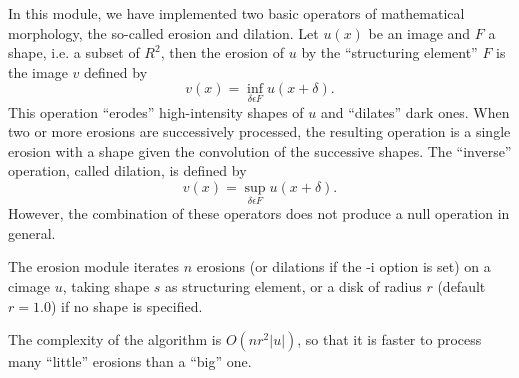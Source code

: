 In this module, we have implemented two basic operators of mathematical 
morphology, the so-called erosion and dilation. Let $u(x)$ be an image 
and $F$ a shape, i.e. a subset of $R^2$, then the erosion of $u$ by the 
``structuring element'' $F$ is the image $v$ defined by
$$v(x) = \inf_{\delta \epsilon F} u(x+\delta).$$
This operation ``erodes'' high-intensity shapes of $u$ and ``dilates'' dark 
ones. 
When two or more erosions are successively processed, the resulting operation 
is a single erosion with a shape given the convolution of the successive 
shapes.
The ``inverse'' operation, called dilation, is defined by
$$v(x) = \sup_{\delta \epsilon F} u(x+\delta).$$
However, the combination of these operators does not produce a null 
operation in general.

The {\sf erosion} module iterates $n$ erosions (or dilations if the -i option 
is set) 
on a cimage $u$, taking shape $s$ as structuring element, or a disk of radius
$r$ (default $r=1.0$) if no shape is specified.

The complexity of the algorithm is $O(n r^2 |u|)$, so that it is faster to
process many ``little'' erosions than a ``big'' one. 


